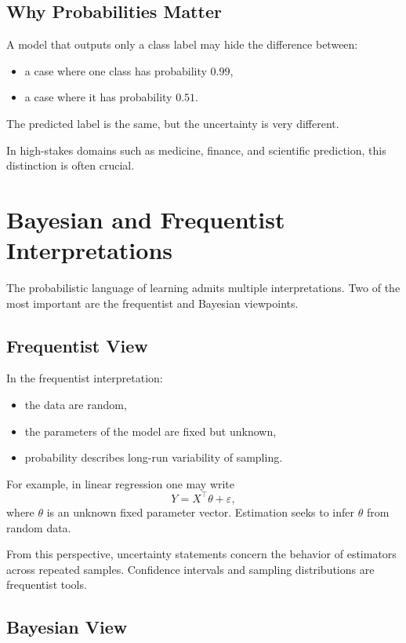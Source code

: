 \subsection{Why Probabilities Matter}

A model that outputs only a class label may hide the difference between:
\begin{itemize}
    \item a case where one class has probability $0.99$,
    \item a case where it has probability $0.51$.
\end{itemize}
The predicted label is the same, but the uncertainty is very different.

In high-stakes domains such as medicine, finance, and scientific prediction, this distinction is often crucial.

\section{Bayesian and Frequentist Interpretations}

The probabilistic language of learning admits multiple interpretations. Two of the most important are the frequentist and Bayesian viewpoints.

\subsection{Frequentist View}

In the frequentist interpretation:
\begin{itemize}
    \item the data are random,
    \item the parameters of the model are fixed but unknown,
    \item probability describes long-run variability of sampling.
\end{itemize}

For example, in linear regression one may write
\[
Y = X^\top \theta + \varepsilon,
\]
where $\theta$ is an unknown fixed parameter vector. Estimation seeks to infer $\theta$ from random data.

From this perspective, uncertainty statements concern the behavior of estimators across repeated samples. Confidence intervals and sampling distributions are frequentist tools.

\subsection{Bayesian View}

